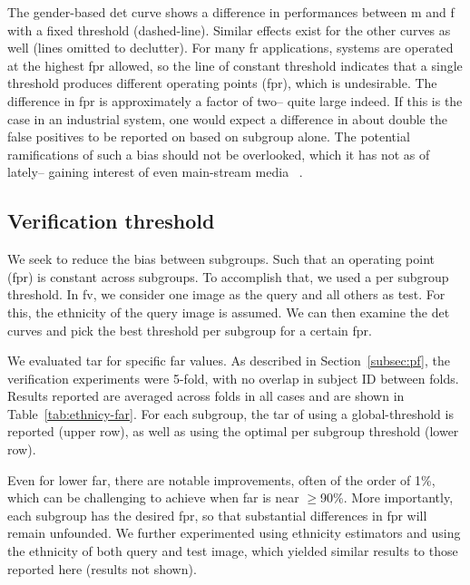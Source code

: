 The gender-based \gls{det} curve shows a difference in performances between \gls{m} and \gls{f} with a fixed threshold (dashed-line). Similar effects exist for the other curves as well (lines omitted to declutter). For many \gls{fr} applications, systems are operated at the highest \gls{fpr} allowed, so the line of constant threshold indicates that a single threshold produces different operating points (\ie \gls{fpr}), which is undesirable.  The difference in \gls{fpr} is approximately a factor of two-- quite large indeed. If this is the case in an industrial system, one would expect a difference in about double the false positives to be reported on based on subgroup alone. The potential ramifications of such a bias should not be overlooked, which it has not as of lately-- gaining interest of even main-stream media ~\cite{england2019,snow2018}.


\subsection{Verification threshold} \label{subsec:analysis:verification}
We seek to reduce the bias between subgroups. Such that an operating point (\ie \gls{fpr}) is constant across subgroups. To accomplish that, we used a per subgroup threshold. In \gls{fv}, we consider one image as the query and all others as test. For this, the ethnicity of the query image is assumed. We can then examine the \gls{det} curves and pick the best threshold per subgroup for a certain \gls{fpr}.

We evaluated \gls{tar} for specific \gls{far} values. As described in Section~\ref{subsec:pf}, the verification experiments were 5-fold, with no overlap in subject ID between folds. Results reported are averaged across folds in all cases and are shown in Table~\ref{tab:ethnicy-far}. For each subgroup, the \gls{tar} of using a global-threshold is reported (upper row), as well as using the optimal per subgroup threshold (lower row). 

Even for lower \gls{far}, there are notable improvements, often of the order of 1\%, which can be challenging to achieve when \gls{far} is near $\geq$90\%. More importantly, each subgroup has the desired \gls{fpr}, so that substantial differences in \gls{fpr} will remain unfounded. We further experimented using ethnicity estimators and using the ethnicity of both query and test image, which yielded similar results to those reported here (results not shown).

